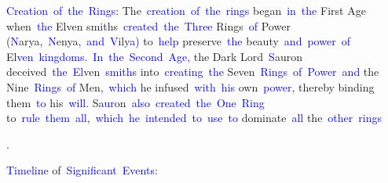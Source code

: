 \documentclass{article}
\begin{document}
\begin{tcolorbox}[colframe=black,colback=white]
{}\textcolor{blue}{Creation}\textcolor{blue}{~of}\textcolor{blue}{~the}\textcolor{blue}{~Rings}: 
The\textcolor{blue}{~creation}\textcolor{blue}{~of}\textcolor{blue}{~the}\textcolor{blue}{~rings} began\textcolor{blue}{~in}\textcolor{blue}{~the} First Age when\textcolor{blue}{~the} Elven smiths\textcolor{blue}{~created}\textcolor{blue}{~the}\textcolor{blue}{~Three} Rings\textcolor{blue}{~of} Power (\textcolor{blue}{N}arya\textcolor{blue}{,}\textcolor{blue}{~N}enya\textcolor{blue}{,}\textcolor{blue}{~and}\textcolor{blue}{~V}ily\textcolor{blue}{a}\textcolor{blue}{)} to\textcolor{blue}{~help} preserve\textcolor{blue}{~the} beauty\textcolor{blue}{~and}\textcolor{blue}{~power}\textcolor{blue}{~of} El\textcolor{blue}{ven}\textcolor{blue}{~kingdoms}\textcolor{blue}{.}\textcolor{blue}{~In}\textcolor{blue}{~the}\textcolor{blue}{~Second}\textcolor{blue}{~Age}\textcolor{blue}{,} the Dark Lord\textcolor{blue}{~S}auron deceived\textcolor{blue}{~the}\textcolor{blue}{~El}ven\textcolor{blue}{~smith}s into\textcolor{blue}{~creating}\textcolor{blue}{~the} Seven\textcolor{blue}{~Rings}\textcolor{blue}{~of}\textcolor{blue}{~Power}\textcolor{blue}{~and} the Nine\textcolor{blue}{~Rings}\textcolor{blue}{~of} Men\textcolor{blue}{,}\textcolor{blue}{~which} he infused\textcolor{blue}{~with}\textcolor{blue}{~his} own\textcolor{blue}{~power}, thereby binding them\textcolor{blue}{~to} his\textcolor{blue}{~will}. S\textcolor{blue}{aur}on\textcolor{blue}{~also}\textcolor{blue}{~created}\textcolor{blue}{~the}\textcolor{blue}{~One}\textcolor{blue}{~Ring} to\textcolor{blue}{~rule}\textcolor{blue}{~them}\textcolor{blue}{~all},\textcolor{blue}{~which}\textcolor{blue}{~he}\textcolor{blue}{~intended}\textcolor{blue}{~to}\textcolor{blue}{~use}\textcolor{blue}{~to} dominate\textcolor{blue}{~all} the\textcolor{blue}{~other}\textcolor{blue}{~rings}\textcolor{blue}{.

}\textcolor{blue}{Timeline} of\textcolor{blue}{~Significant}\textcolor{blue}{~Events}: 


\end{tcolorbox}
\end{document}
